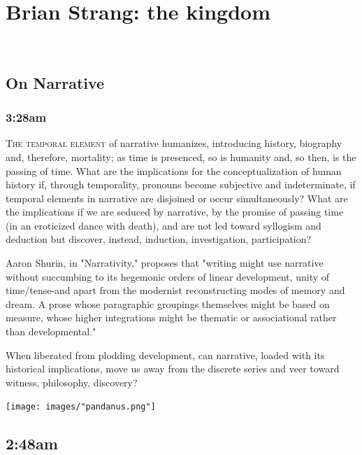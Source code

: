 \documentclass[
]{memoir}
\begin{document}
~

\hypertarget{brian-strang-the-kingdom}{%
\chapter{Brian Strang: the kingdom}\label{brian-strang-the-kingdom}}

~

\hypertarget{on-narrative}{%
\section*{On Narrative}\label{on-narrative}}

\hypertarget{am}{%
\subsection*{3:28am}\label{am}}

\lettrine[lines=3, findent=0em, nindent=0.1em, lhang=0]{T}{he temporal element}
of narrative humanizes, introducing history, biography and, therefore,
mortality; as time is presenced, so is humanity and, so then, is the
passing of time. What are the implications for the conceptualization of
human history if, through temporality, pronouns become subjective and
indeterminate, if temporal elements in narrative are disjoined or occur
simultaneously? What are the implications if we are seduced by
narrative, by the promise of passing time (in an eroticized dance with
death), and are not led toward syllogism and deduction but discover,
instead, induction, investigation, participation?

Aaron Shurin, in "Narrativity," proposes that "writing might use
narrative without succumbing to its hegemonic orders of linear
development, unity of time/tense-and apart from the modernist
reconstructing modes of memory and dream. A prose whose paragraphic
groupings themselves might be based on measure, whose higher
integrations might be thematic or associational rather than
developmental."

When liberated from plodding development, can narrative, loaded with its
historical implications, move us away from the discrete series and veer
toward witness, philosophy, discovery?

\begin{center}\texttt{[image: images/"pandanus.png"]}\end{center}

\hypertarget{am-1}{%
\section*{2:48am}\label{am-1}}
\end{document}
